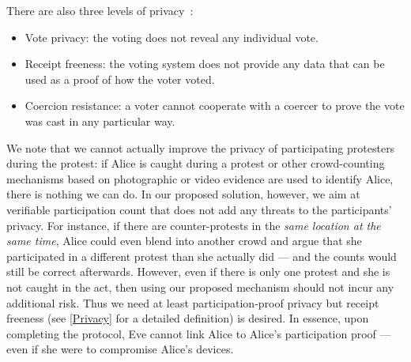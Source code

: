 There are also three levels of 
privacy~\cite{VerifyingPrivacyPropertiesOfVotingProtocols}:
\begin{itemize}
  \item\label{VotePrivacy} Vote privacy: the voting does not reveal any 
    individual vote.
  \item\label{ReceiptFreeness} Receipt freeness: the voting system does not 
    provide any data that can be used as a proof of how the voter voted.
  \item\label{CoercionResistance} Coercion resistance: a voter cannot cooperate 
    with a coercer to prove the vote was cast in any particular way.
\end{itemize}
We note that we cannot actually improve the privacy of participating protesters during 
the protest: if Alice is caught during a protest or other
crowd-counting mechanisms based on photographic or video evidence are
used to identify Alice, there is nothing we
can do. In our proposed solution, however, we aim at verifiable
participation count that does not add any threats to the participants'
privacy. For instance, if there are counter-protests in the \emph{same location at the same 
  time}, Alice could even blend into another crowd and argue that she participated in 
a different protest than she actually did --- and the counts would still be 
correct afterwards.
However, even if there is only one protest and she is not caught in the act, 
then using our proposed mechanism should not incur any additional risk.
Thus we need at least participation-proof privacy but receipt freeness (see 
\cref{Privacy} for a detailed definition) is desired.
In essence, upon completing the protocol, Eve cannot link Alice to Alice's 
participation proof --- even if she were to compromise Alice's
devices.
